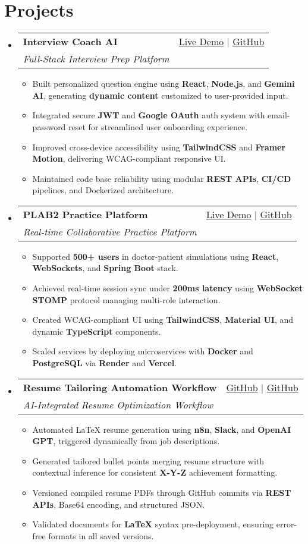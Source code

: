 \documentclass[letterpaper,11pt]{article}
\makeatletter
\newcommand{\resumeItem}[1]{\item\small{#1 \vspace{-2pt}}}
\newcommand{\resumeSubheading}[4]{
  \vspace{-1pt}\item
    \begin{tabular*}{0.97\textwidth}[t]{l@{\extracolsep{\fill}}r}
      \textbf{#1} & #2 \\
      \textit{\small#3} & \textit{\small #4} \\
    \end{tabular*}\vspace{-5pt}
}
\newcommand{\resumeSubHeadingListStart}{\begin{itemize}[leftmargin=*]}
\newcommand{\resumeSubHeadingListEnd}{\end{itemize}}
\newcommand{\resumeItemListStart}{\begin{itemize}}
\newcommand{\resumeItemListEnd}{\end{itemize}\vspace{-5pt}}
\makeatother
\begin{document}
\section{Projects}
  \resumeSubHeadingListStart
    \resumeSubheading
      {\textbf{Interview Coach AI}}{\href{https://interviewcoach-ai.vercel.app}{Live Demo} | \href{https://github.com/altansaid/interviewcoach-ai}{GitHub}}
      {Full-Stack Interview Prep Platform}{}
      \resumeItemListStart
        \resumeItem{Built personalized question engine using \textbf{React}, \textbf{Node.js}, and \textbf{Gemini AI}, generating \textbf{dynamic content} customized to user-provided input.}
        \resumeItem{Integrated secure \textbf{JWT} and \textbf{Google OAuth} auth system with email-password reset for streamlined user onboarding experience.}
        \resumeItem{Improved cross-device accessibility using \textbf{TailwindCSS} and \textbf{Framer Motion}, delivering WCAG-compliant responsive UI.}
        \resumeItem{Maintained code base reliability using modular \textbf{REST APIs}, \textbf{CI/CD} pipelines, and Dockerized architecture.}
      \resumeItemListEnd

    \resumeSubheading
      {\textbf{PLAB2 Practice Platform}}{\href{https://plab2practice.com}{Live Demo} | \href{https://github.com/altansaid/plab2projectnew}{GitHub}}
      {Real-time Collaborative Practice Platform}{}
      \resumeItemListStart
        \resumeItem{Supported \textbf{500+ users} in doctor-patient simulations using \textbf{React}, \textbf{WebSockets}, and \textbf{Spring Boot} stack.}
        \resumeItem{Achieved real-time session sync under \textbf{200ms latency} using \textbf{WebSocket STOMP} protocol managing multi-role interaction.}
        \resumeItem{Created WCAG-compliant UI using \textbf{TailwindCSS}, \textbf{Material UI}, and dynamic \textbf{TypeScript} components.}
        \resumeItem{Scaled services by deploying microservices with \textbf{Docker} and \textbf{PostgreSQL} via \textbf{Render} and \textbf{Vercel}.}
      \resumeItemListEnd

    \resumeSubheading
      {\textbf{Resume Tailoring Automation Workflow}}{\href{}{GitHub} | \href{https://github.com/altansaid/resume-updates}{GitHub}}
      {AI-Integrated Resume Optimization Workflow}{}
      \resumeItemListStart
        \resumeItem{Automated LaTeX resume generation using \textbf{n8n}, \textbf{Slack}, and \textbf{OpenAI GPT}, triggered dynamically from job descriptions.}
        \resumeItem{Generated tailored bullet points merging resume structure with contextual inference for consistent \textbf{X-Y-Z} achievement formatting.}
        \resumeItem{Versioned compiled resume PDFs through GitHub commits via \textbf{REST APIs}, Base64 encoding, and structured JSON.}
        \resumeItem{Validated documents for \textbf{LaTeX} syntax pre-deployment, ensuring error-free formats in all saved versions.}
      \resumeItemListEnd
  \resumeSubHeadingListEnd
\end{document}
